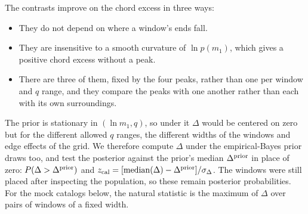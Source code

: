 \documentclass[%
 onecolumn,
 amsmath,amssymb,
 aps,
 prl,
 nofootinbib,nobibnotes,
]{revtex4-2}
\begin{document}
The contrasts improve on the chord excess in three ways:
\begin{itemize}
    \item They do not depend on where a window's ends fall.
    \item They are insensitive to a smooth curvature of $\ln p(m_1)$, which gives a positive chord excess without a peak.
    \item There are three of them, fixed by the four peaks, rather than one per window and $q$ range, and they compare the peaks with one another rather than each with its own surroundings.
\end{itemize}
The prior is stationary in $(\ln m_1, q)$, so under it $\Delta$ would be centered on zero but for the different allowed $q$ ranges, the different widths of the windows and edge effects of the grid. We therefore compute $\Delta$ under the empirical-Bayes prior draws too, and test the posterior against the prior's median $\Delta^{\rm prior}$ in place of zero: $P(\Delta > \Delta^{\rm prior})$ and $z_{\rm cal} = [\mathrm{median}(\Delta) - \Delta^{\rm prior}] / \sigma_\Delta$. The windows were still placed after inspecting the population, so these remain posterior probabilities. For the mock catalogs below, the natural statistic is the maximum of $\Delta$ over pairs of windows of a fixed width.
\end{document}
